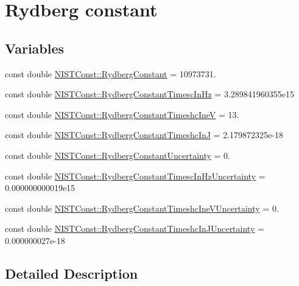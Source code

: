 \hypertarget{group___n_i_s_t_const-_rydberg_constant}{}\section{Rydberg constant}
\label{group___n_i_s_t_const-_rydberg_constant}
\subsection*{Variables}
\begin{DoxyCompactItemize}
\item 
const double \hyperlink{group___n_i_s_t_const-_rydberg_constant_gaa434f78f9fead2fcf2e129a137853e26}{N\+I\+S\+T\+Const\+::\+Rydberg\+Constant} = 10973731.
\item 
const double \hyperlink{group___n_i_s_t_const-_rydberg_constant_ga473e14f2663eccecd987928be1d512ad}{N\+I\+S\+T\+Const\+::\+Rydberg\+Constant\+Timesc\+In\+Hz} = 3.\+289841960355e15
\item 
const double \hyperlink{group___n_i_s_t_const-_rydberg_constant_ga77c7dd314342e7f121d9b8775a45d20f}{N\+I\+S\+T\+Const\+::\+Rydberg\+Constant\+Timeshc\+IneV} = 13.
\item 
const double \hyperlink{group___n_i_s_t_const-_rydberg_constant_gaa4164006d51dbf240eb83065e83bddec}{N\+I\+S\+T\+Const\+::\+Rydberg\+Constant\+Timeshc\+InJ} = 2.\+179872325e-\/18
\item 
const double \hyperlink{group___n_i_s_t_const-_rydberg_constant_ga694e342f62e81330dcc1b1469acc945c}{N\+I\+S\+T\+Const\+::\+Rydberg\+Constant\+Uncertainty} = 0.
\item 
const double \hyperlink{group___n_i_s_t_const-_rydberg_constant_ga02443a9398e1e1a60ee2e9271f814964}{N\+I\+S\+T\+Const\+::\+Rydberg\+Constant\+Timesc\+In\+Hz\+Uncertainty} = 0.\+000000000019e15
\item 
const double \hyperlink{group___n_i_s_t_const-_rydberg_constant_gab03fbc3395eeac5538a651a8ee29f2b2}{N\+I\+S\+T\+Const\+::\+Rydberg\+Constant\+Timeshc\+Ine\+V\+Uncertainty} = 0.
\item 
const double \hyperlink{group___n_i_s_t_const-_rydberg_constant_ga448546d3ffdb4f72ddd2ab15d5e9e470}{N\+I\+S\+T\+Const\+::\+Rydberg\+Constant\+Timeshc\+In\+J\+Uncertainty} = 0.\+000000027e-\/18
\end{DoxyCompactItemize}


\subsection{Detailed Description}


